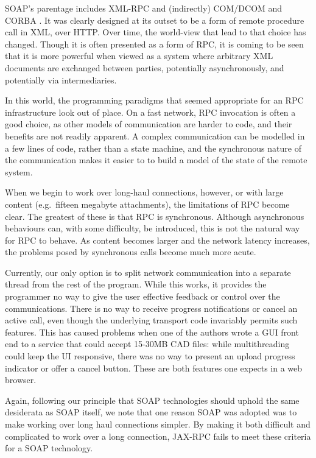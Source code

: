 SOAP's parentage includes XML-RPC \cite{winer:xmlrpc} and (indirectly)
COM/DCOM \cite{dbox:SoapHistory,dbox:com}and CORBA \cite{vinoski:CORBA}. It was clearly
designed at its outset to be a form of remote procedure call in XML,
over HTTP. Over time, the world-view that lead to that choice has
changed. Though it is often presented as a form of RPC, it is coming
to be seen that it is more powerful when viewed as a system where
arbitrary XML documents are exchanged between parties, potentially
asynchronously, and potentially via intermediaries.

In this world, the programming paradigms that seemed appropriate for
an RPC infrastructure look out of place. On a fast network, RPC
invocation is often a good choice, as other models of communication
are harder to code, and their benefits are not readily apparent. A complex
communication can be modelled in a few lines of code, rather than a state
machine, and the synchronous nature of the communication makes it easier to
to build a model of the state of the remote system.  

When we begin to work over long-haul connections, however, or with
large content (e.g.\ fifteen megabyte attachments), the limitations of
RPC become clear. The greatest of these is that RPC is
synchronous. Although asynchronous behaviours can, with some
difficulty, be introduced, this is not the natural way for RPC to
behave. As content becomes larger and the network latency increases,
the problems posed by synchronous calls become much more acute.

Currently, our only option is to split network communication into a
separate thread from the rest of the program. While this works, it
provides the programmer no way to give the user effective feedback or
control over the communications. There is no way to receive progress
notifications or cancel an active call, even though the underlying
transport code invariably permits such features. This has caused
problems when one of the authors wrote a GUI front end to a service
that could accept 15-30MB CAD files: while multithreading could keep
the UI responsive, there was no way to present an upload progress
indicator or offer a cancel button. These are both features one
expects in a web browser.

Again, following our principle that SOAP technologies should uphold
the same desiderata as SOAP itself, we note that one reason SOAP was
adopted was to make working over long haul connections simpler. By
making it both difficult and complicated to work over a long
connection, JAX-RPC fails to meet these criteria for a SOAP
technology.

